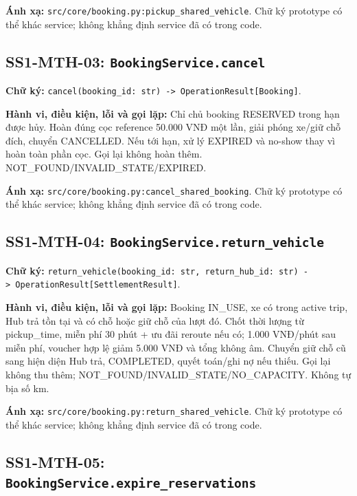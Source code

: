 \documentclass[11pt,a4paper]{article}
\begin{document}
\textbf{Ánh xạ:} \texttt{src/core/booking.py:pickup\_shared\_vehicle}.
Chữ ký prototype có thể khác service; không khẳng định service đã có
trong code.

\hypertarget{ss1-mth-03-bookingservice.cancel}{%
\subsection{\texorpdfstring{SS1-MTH-03:
\texttt{BookingService.cancel}}{SS1-MTH-03: BookingService.cancel}}\label{ss1-mth-03-bookingservice.cancel}}

\textbf{Chữ ký:}
\texttt{cancel(booking\_id:\ str)\ -\textgreater{}\ OperationResult{[}Booking{]}}.

\textbf{Hành vi, điều kiện, lỗi và gọi lặp:} Chỉ chủ booking RESERVED
trong hạn được hủy. Hoàn đúng cọc reference 50.000 VNĐ một lần, giải
phóng xe/giữ chỗ đích, chuyển CANCELLED. Nếu tới hạn, xử lý EXPIRED và
no-show thay vì hoàn toàn phần cọc. Gọi lại không hoàn thêm.
NOT\_FOUND/INVALID\_STATE/EXPIRED.

\textbf{Ánh xạ:} \texttt{src/core/booking.py:cancel\_shared\_booking}.
Chữ ký prototype có thể khác service; không khẳng định service đã có
trong code.

\hypertarget{ss1-mth-04-bookingservice.return_vehicle}{%
\subsection{\texorpdfstring{SS1-MTH-04:
\texttt{BookingService.return\_vehicle}}{SS1-MTH-04: BookingService.return\_vehicle}}\label{ss1-mth-04-bookingservice.return_vehicle}}

\textbf{Chữ ký:}
\texttt{return\_vehicle(booking\_id:\ str,\ return\_hub\_id:\ str)\ -\textgreater{}\ OperationResult{[}SettlementResult{]}}.

\textbf{Hành vi, điều kiện, lỗi và gọi lặp:} Booking IN\_USE, xe có
trong active trip, Hub trả tồn tại và có chỗ hoặc giữ chỗ của lượt đó.
Chốt thời lượng từ pickup\_time, miễn phí 30 phút + ưu đãi reroute nếu
có; 1.000 VNĐ/phút sau miễn phí, voucher hợp lệ giảm 5.000 VNĐ và tổng
không âm. Chuyển giữ chỗ cũ sang hiện diện Hub trả, COMPLETED, quyết
toán/ghi nợ nếu thiếu. Gọi lại không thu thêm;
NOT\_FOUND/INVALID\_STATE/NO\_CAPACITY. Không tự bịa số km.

\textbf{Ánh xạ:} \texttt{src/core/booking.py:return\_shared\_vehicle}.
Chữ ký prototype có thể khác service; không khẳng định service đã có
trong code.

\hypertarget{ss1-mth-05-bookingservice.expire_reservations}{%
\subsection{\texorpdfstring{SS1-MTH-05:
\texttt{BookingService.expire\_reservations}}{SS1-MTH-05: BookingService.expire\_reservations}}\label{ss1-mth-05-bookingservice.expire_reservations}}
\end{document}
